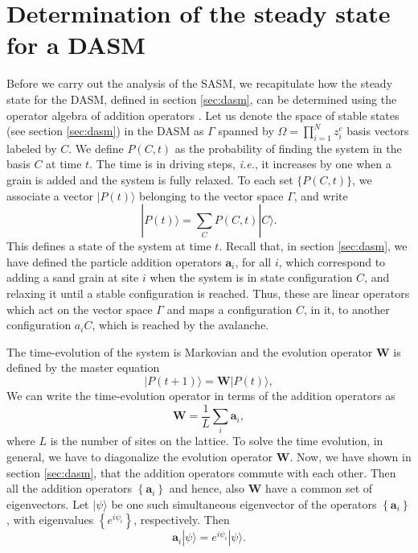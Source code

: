 \documentclass[11pt,a4paper]{book}
\begin{document}
\section{Determination of the steady state for a
DASM}\label{sec:ch5.2.5}
Before we carry out the analysis of the SASM, we recapitulate how the
steady state for the DASM, defined in section \ref{sec:dasm}, can be determined using the operator algebra
of addition operators \cite{dharphysica06}.
Let us denote the space of stable states (see section
\ref{sec:dasm}) in the DASM as $\Gamma$ spanned by
$\Omega=\prod_{i=1}^{N}z_{i}^{c}$ basis vectors labeled by $C$. We define $P(C,t)$ as the probability of
finding the system in the basis $C$ at time $t$. The time is in
driving steps, \textit{i.e.}, it increases by one when a grain is
added and the system is fully relaxed. To each set
$\{P(C,t)\}$, we associate a vector $|P(t)\rangle$ belonging to the
vector space $\Gamma$, and write 
\begin{equation}
  |P(t)\rangle = \sum_C P(C,t)|C\rangle.
  \label{P(t)}
\end{equation}
This defines a state of the system at time $t$.
Recall that, in section \ref{sec:dasm}, we have defined the particle addition
operators $\textbf{a}_i$, for all $i$, which correspond to adding a sand grain at site $i$
when the system is in state configuration $C$, and relaxing it until a stable
configuration is reached. Thus, these are linear operators which act
on the vector space $\Gamma$ and maps a configuration $C$, in it, to another
configuration $a_{i}C$, which is reached by the avalanche.

The time-evolution of the system is Markovian \cite{vkampen} and the evolution
operator $\mathbf{W}$ is defined by the master equation
\begin{equation}
|P\left( t+1 \right)\rangle =\mathbf{W}|P\left(t\right)\rangle,
\end{equation}
We can write the time-evolution operator in terms of the addition
operators as
\begin{equation}
\mathbf{W}=\frac{1}{L}\sum_{i}\mathbf{a}_{i},
\end{equation}
where $L$ is the number of sites on the lattice.
To solve the time evolution, in general, we have to diagonalize the
evolution operator $\mathbf{W}$. Now, we have shown in section \ref{sec:dasm},
that the addition operators commute with each other. Then all
the addition operators $\left\{ \mathbf{a}_{i} \right\}$ and hence, also $\mathbf{W}$ have a common set
of eigenvectors. Let $|\psi\rangle$ be one such simultaneous eigenvector of
the operators $\left\{ \mathbf{a}_{i} \right\}$, with eigenvalues
$\left\{e^{i\psi_{i}}\right\}$, respectively. Then
\begin{equation}
\mathbf{a}_{i}|\psi\rangle=e^{i\psi_{i}}|\psi\rangle.
\end{equation}
\end{document}
